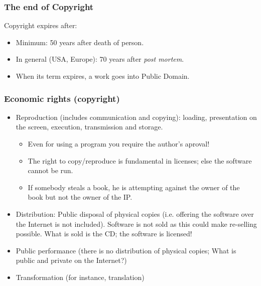 
\begin{frame}
\frametitle{The end of Copyright}

Copyright expires after:

\begin{itemize}
\item Minimum: 50 years after death of person. 
\item In general (USA, Europe): 70 years after \textit{post mortem}.
\item When its term expires, a work goes into Public Domain.

\end{itemize}

\end{frame}


\begin{frame}
\frametitle{Economic rights (copyright)}

\begin{itemize}
\item Reproduction (includes communication and copying): loading,
presentation on the screen, execution, transmission and storage.
\begin{itemize}
\item Even for using a program you require the author's aproval!
\item The right to copy/reproduce is fundamental in licenses; else
the software cannot be run.
\item If somebody steals a book, he is attempting against the owner
of the book but not the owner of the IP. 
\end{itemize}
\item Distribution: Public disposal of physical copies (i.e. offering
the software over the Internet is not included). Software is not
sold as this could make re-selling possible. What is sold is the CD; the
software is licensed!
\item Public performance (there is no distribution of physical copies; What is public and private
on the Internet?)
\item Transformation (for instance, translation)
\end{itemize}


\end{frame}



